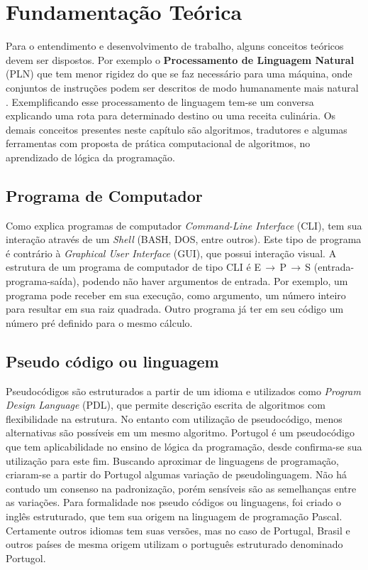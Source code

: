 \chapter{Fundamentação Teórica}

Para o entendimento e desenvolvimento de trabalho, alguns conceitos teóricos devem ser dispostos. Por exemplo o \textbf{Processamento de Linguagem Natural} (PLN) que tem menor rigidez do que se faz necessário para uma máquina, onde conjuntos de instruções podem ser descritos de modo humanamente mais natural \cite{medina2006etal}. Exemplificando esse processamento de linguagem tem-se um conversa explicando uma rota para determinado destino ou uma receita culinária. Os demais conceitos presentes neste capítulo são algoritmos, tradutores e algumas ferramentas com proposta de prática computacional de algoritmos, no aprendizado de lógica da programação.

\section{Programa de Computador}

Como explica  programas de computador \textit{Command-Line Interface} (CLI), tem sua interação através de um \textit{Shell} (BASH, DOS, entre outros). Este tipo de programa é contrário à \textit{Graphical User Interface} (GUI), que possui interação visual. A estrutura de um programa de computador de tipo CLI é E$\,\to\,$P$\,\to\,$S (entrada-programa-saída), podendo não haver argumentos de entrada. Por exemplo, um programa pode receber em sua execução, como argumento, um número inteiro para resultar em sua raiz quadrada. Outro programa já ter em seu código um número pré definido para o mesmo cálculo.

\section{Pseudo código ou linguagem}

Pseudocódigos são estruturados a partir de um idioma e utilizados como \textit{Program Design Language} (PDL), que permite descrição escrita de algoritmos com flexibilidade na estrutura. No entanto com utilização de pseudocódigo, menos alternativas são possíveis em um mesmo algoritmo. Portugol é um pseudocódigo que tem aplicabilidade no ensino de lógica da programação, desde  confirma-se sua utilização para este fim. Buscando aproximar de linguagens de programação, criaram-se a partir do Portugol algumas variação de pseudolinguagem. Não há contudo um consenso na padronização, porém sensíveis são as semelhanças entre as variações. Para formalidade nos pseudo códigos ou linguagens, foi criado o inglês estruturado, que tem sua origem na linguagem de programação Pascal. Certamente outros idiomas tem suas versões, mas no caso de Portugal, Brasil e outros países de mesma origem utilizam o português estruturado denominado Portugol.

